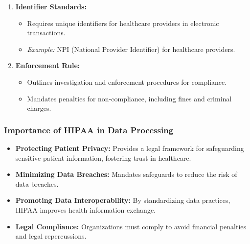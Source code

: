 \documentclass{beamer}
\begin{document}
\begin{frame}[fragile]
\begin{enumerate}
        \item \textbf{Identifier Standards:}
        \begin{itemize}
            \item Requires unique identifiers for healthcare providers in electronic transactions.
            \item \textit{Example:} NPI (National Provider Identifier) for healthcare providers.
        \end{itemize}
        
        \item \textbf{Enforcement Rule:}
        \begin{itemize}
            \item Outlines investigation and enforcement procedures for compliance.
            \item Mandates penalties for non-compliance, including fines and criminal charges.
        \end{itemize}
    \end{enumerate}
\end{frame}

\begin{frame}[fragile]
    \frametitle{Importance of HIPAA in Data Processing}
    \begin{itemize}
        \item \textbf{Protecting Patient Privacy:} Provides a legal framework for safeguarding 
        sensitive patient information, fostering trust in healthcare.
        
        \item \textbf{Minimizing Data Breaches:} Mandates safeguards to reduce the risk of data 
        breaches.
        
        \item \textbf{Promoting Data Interoperability:} By standardizing data practices, HIPAA 
        improves health information exchange.
        
        \item \textbf{Legal Compliance:} Organizations must comply to avoid financial penalties 
        and legal repercussions.
    \end{itemize}
\end{frame}
\end{document}
